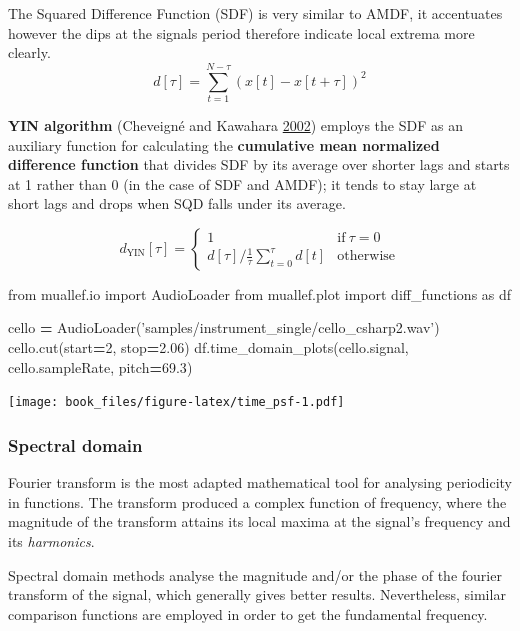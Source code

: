 \documentclass[american,]{article}
\newenvironment{Shaded}{\begin{snugshade}}{\end{snugshade}}
\newcommand{\DecValTok}[1]{\textcolor[rgb]{0.00,0.00,0.81}{#1}}
\newcommand{\FloatTok}[1]{\textcolor[rgb]{0.00,0.00,0.81}{#1}}
\newcommand{\ImportTok}[1]{#1}
\newcommand{\NormalTok}[1]{#1}
\newcommand{\OperatorTok}[1]{\textcolor[rgb]{0.81,0.36,0.00}{\textbf{#1}}}
\newcommand{\StringTok}[1]{\textcolor[rgb]{0.31,0.60,0.02}{#1}}
\begin{document}
The Squared Difference Function (SDF) is very similar to AMDF,
it accentuates however the dips at the signals period
therefore indicate local extrema more clearly.
\[d[\tau] = \sum_{t=1}^{N-\tau}(x[t]-x[t+\tau])^2\]

\textbf{YIN algorithm} (Cheveigné and Kawahara \protect\hyperlink{ref-yin_2002}{2002}) employs the SDF as an auxiliary
function for calculating the \textbf{cumulative mean normalized
difference function} that divides SDF by its average
over shorter lags and starts at 1 rather than 0 (in the case
of SDF and AMDF); it tends to stay large at short lags
and drops when SQD falls under its average.

\[d_{\text{YIN}}[\tau] = \begin{cases}
    1 &\text{if}~\tau = 0\\
    d[\tau] / \frac{1}{\tau}\sum\limits_{t=0}^{\tau} d[t]
        &\text{otherwise}
\end{cases}\]

\begin{Shaded}
\begin{Highlighting}[]
\ImportTok{from}\NormalTok{ muallef.io }\ImportTok{import}\NormalTok{ AudioLoader}
\ImportTok{from}\NormalTok{ muallef.plot }\ImportTok{import}\NormalTok{ diff_functions }\ImportTok{as}\NormalTok{ df}

\NormalTok{cello }\OperatorTok{=}\NormalTok{ AudioLoader(}\StringTok{'samples/instrument_single/cello_csharp2.wav'}\NormalTok{)}
\NormalTok{cello.cut(start}\OperatorTok{=}\DecValTok{2}\NormalTok{, stop}\OperatorTok{=}\FloatTok{2.06}\NormalTok{)}
\NormalTok{df.time_domain_plots(cello.signal, cello.sampleRate, pitch}\OperatorTok{=}\FloatTok{69.3}\NormalTok{)}
\end{Highlighting}
\end{Shaded}

\texttt{[image: book\_files/figure-latex/time\_psf-1.pdf]}

\hypertarget{spectral-domain}{%
\subsubsection{Spectral domain}\label{spectral-domain}}

Fourier transform is the most adapted mathematical tool
for analysing periodicity in functions.
The transform produced a complex function of frequency,
where the magnitude of the transform attains its local
maxima at the signal's frequency and its \emph{harmonics}.

Spectral domain methods analyse the magnitude and/or the phase
of the fourier transform of the signal,
which generally gives better results.
Nevertheless, similar comparison functions are employed
in order to get the fundamental frequency.
\end{document}
